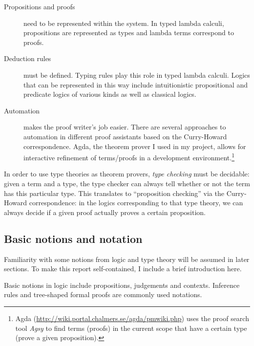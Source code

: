 \begin{description}
\item[Propositions and proofs] need to be represented within the system. In typed lambda calculi, propositions are represented as types and lambda terms correspond to proofs.
\item[Deduction rules] must be defined. Typing rules play this role in typed lambda calculi. Logics that can be represented in this way include intuitionistic propositional and predicate logics of various kinds as well as classical logics.
\item[Automation] makes the proof writer's job easier. There are several approaches to automation in different proof assistants based on the Curry-Howard correspondence. Agda, the theorem prover I used in my project, allows for interactive refinement of terms/proofs in a development environment.\footnote{Agda (\url{http://wiki.portal.chalmers.se/agda/pmwiki.php}) uses the proof search tool \emph{Agsy} \autocite{lindblad_tool_2006} to find terms (proofs) in the current scope that have a certain type (prove a given proposition).}
\end{description}

In order to use type theories as theorem provers, \emph{type checking} must be decidable: given a term and a type, the type checker can always tell whether or not the term has this particular type. This translates to \enquote{proposition checking} via the Curry-Howard correspondence: in the logics corresponding to that type theory, we can always decide if a given proof actually proves a certain proposition.


\subsection{Basic notions and notation}

Familiarity with some notions from logic and type theory will be assumed in later sections. To make this report self-contained, I include a brief introduction here.


Basic notions in logic include propositions, judgements and contexts. Inference rules and tree-shaped formal proofs are commonly used notations.

